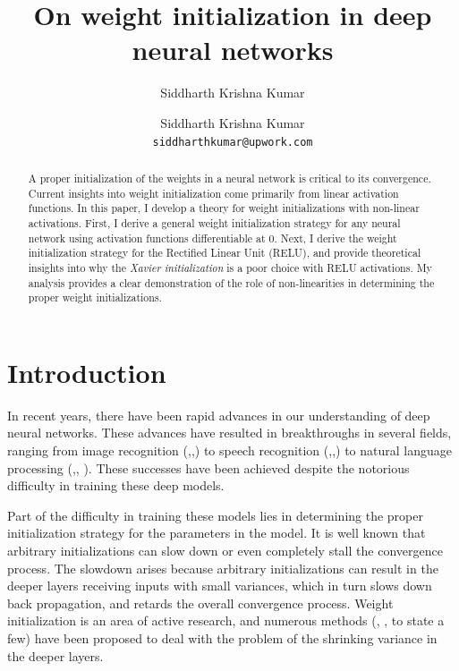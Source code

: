 \documentclass[a4paper]{article}
\title{On weight initialization in deep neural networks}
\author{Siddharth Krishna Kumar}
\author{
  Siddharth Krishna Kumar \\
  \texttt{siddharthkumar@upwork.com}
}
\begin{document}

\maketitle

\begin{abstract}
A proper initialization of the weights in a neural network is critical to its convergence. Current insights into weight initialization come primarily from linear activation functions. In this paper, I develop a theory for weight initializations with non-linear activations.
First, I derive a general weight initialization strategy for any neural network using activation functions differentiable at 0. Next, I derive the weight initialization strategy for the Rectified Linear Unit (RELU), and provide theoretical insights into why the {\it{Xavier initialization}} is a poor choice with RELU activations. My analysis provides a clear demonstration of the role of non-linearities in determining the proper weight initializations.
\end{abstract}

\section{Introduction}

In recent years, there have been rapid advances in our understanding of deep neural networks. These advances have resulted in breakthroughs in several fields, ranging from image recognition (\cite{russakovsky2015imagenet},\cite{szegedy2013deep},\cite{toshev2014deeppose}) to speech recognition (\cite{graves2013speech},\cite{maas2013rectifier},\cite{sutskever2014sequence}) to natural language processing (\cite{collobert2008unified},\cite{kim2014convolutional}, \cite{socher2011parsing}). These successes have been achieved despite the notorious difficulty in training these deep models.

Part of the difficulty in training these models lies in determining the proper initialization strategy for the parameters in the model. It is well known \cite{mishkin2015all} that arbitrary initializations can slow down or even completely stall the convergence process. The slowdown arises because arbitrary initializations can result in the deeper layers receiving inputs with small variances, which in turn slows down back propagation, and retards the overall convergence process. Weight initialization is an area of active research, and numerous methods (\cite{mishkin2015all}, \cite{saxe2013exact}, \cite{sussillo2014random} to state a few) have been proposed to deal with the problem of the shrinking variance in the deeper layers.
\end{document}
